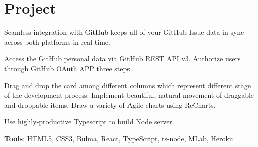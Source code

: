 \documentclass[letterpaper]{deedy-resume} %
\begin{document}
\hfill
%
%
\begin{minipage}[t]{0.66\textwidth} %


\section{Project}

\vspace{\topsep} %
\begin{tightitemize}
	\item Seamless integration with GitHub keeps all of your GitHub Issue data in sync across both platforms in real time.
	\item Access the GitHub personal data via GitHub REST API v3. Authorize users through GitHub OAuth APP three steps.
	\item Drag and drop the card among different columns which represent different stage of the development process. Implement beautiful, natural movement of draggable and droppable items. Draw a variety of Agile charts using ReCharts.
	\item Use highly-productive Typescript to build Node server.
	\item \textbf{Tools}: HTML5, CSS3, Bulma, React, TypeScript, ts-node, MLab, Heroku
\end{tightitemize}

\sectionspace %


\end{minipage}
\end{document}
